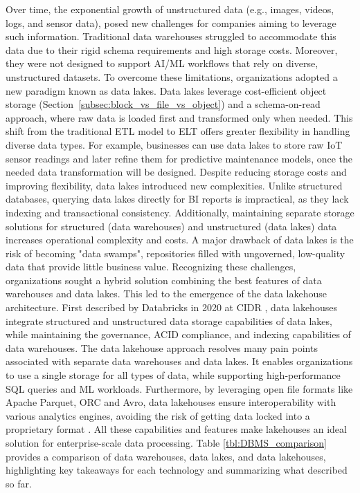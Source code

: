 Over time, the exponential growth of unstructured data (e.g., images, videos, logs, and sensor data), posed new challenges for companies aiming to leverage such information. Traditional data warehouses struggled to accommodate this data due to their rigid schema requirements and high storage costs. Moreover, they were not designed to support \gls{AI}/\gls{ML} workflows that rely on diverse, unstructured datasets. To overcome these limitations, organizations adopted a new paradigm known as data lakes. Data lakes leverage cost-efficient object storage (Section~\ref{subsec:block_vs_file_vs_object}) and a schema-on-read approach, where raw data is loaded first and transformed only when needed. This shift from the traditional \gls{ETL} model to \gls{ELT} offers greater flexibility in handling diverse data types. For example, businesses can use data lakes to store raw IoT sensor readings and later refine them for predictive maintenance models, once the needed data transformation will be designed. Despite reducing storage costs and improving flexibility, data lakes introduced new complexities. Unlike structured databases, querying data lakes directly for \gls{BI} reports is impractical, as they lack indexing and transactional consistency. Additionally, maintaining separate storage solutions for structured (data warehouses) and unstructured (data lakes) data increases operational complexity and costs. A major drawback of data lakes is the risk of becoming "data swamps", repositories filled with ungoverned, low-quality data that provide little business value. Recognizing these challenges, organizations sought a hybrid solution combining the best features of data warehouses and data lakes. This led to the emergence of the data lakehouse architecture. First described by Databricks in 2020 at \gls{CIDR} \cite{lakehouse2021}, data lakehouses integrate structured and unstructured data storage capabilities of data lakes, while maintaining the governance, \gls{ACID} compliance, and indexing capabilities of data warehouses. The data lakehouse approach resolves many pain points associated with separate data warehouses and data lakes. It enables organizations to use a single storage for all types of data, while supporting high-performance \gls{SQL} queries and \gls{ML} workloads. Furthermore, by leveraging open file formats like Apache Parquet, ORC and Avro, data lakehouses ensure interoperability with various analytics engines, avoiding the risk of getting data locked into a proprietary format \cite{mazumdarDataLakehouseData2023}. All these capabilities and features make lakehouses an ideal solution for enterprise-scale data processing. Table \ref{tbl:DBMS_comparison} provides a comparison of data warehouses, data lakes, and data lakehouses, highlighting key takeaways for each technology and summarizing what described so far.


